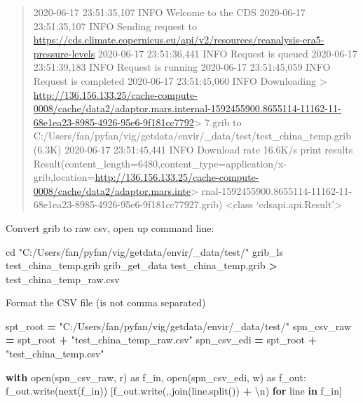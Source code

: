 \documentclass[
]{book}
\newenvironment{Shaded}{\begin{snugshade}}{\end{snugshade}}
\newcommand{\BuiltInTok}[1]{#1}
\newcommand{\CharTok}[1]{\textcolor[rgb]{0.31,0.60,0.02}{#1}}
\newcommand{\ControlFlowTok}[1]{\textcolor[rgb]{0.13,0.29,0.53}{\textbf{#1}}}
\newcommand{\ExtensionTok}[1]{#1}
\newcommand{\ImportTok}[1]{#1}
\newcommand{\KeywordTok}[1]{\textcolor[rgb]{0.13,0.29,0.53}{\textbf{#1}}}
\newcommand{\NormalTok}[1]{#1}
\newcommand{\OperatorTok}[1]{\textcolor[rgb]{0.81,0.36,0.00}{\textbf{#1}}}
\newcommand{\StringTok}[1]{\textcolor[rgb]{0.31,0.60,0.02}{#1}}
\begin{document}
\begin{quote}
2020-06-17 23:51:35,107 INFO Welcome to the CDS
2020-06-17 23:51:35,107 INFO Sending request to \url{https://cds.climate.copernicus.eu/api/v2/resources/reanalysis-era5-pressure-levels}
2020-06-17 23:51:36,441 INFO Request is queued
2020-06-17 23:51:39,183 INFO Request is running
2020-06-17 23:51:45,059 INFO Request is completed
2020-06-17 23:51:45,060 INFO Downloading \textgreater{} \url{http://136.156.133.25/cache-compute-0008/cache/data2/adaptor.mars.internal-1592455900.8655114-11162-11-68e1ea23-8985-4926-95e6-9f181cc7792}\textgreater{} 7.grib to C:/Users/fan/pyfan/vig/getdata/envir/\_data/test/test\_china\_temp.grib (6.3K)
2020-06-17 23:51:45,441 INFO Download rate 16.6K/s
print results
Result(content\_length=6480,content\_type=application/x-grib,location=\url{http://136.156.133.25/cache-compute-0008/cache/data2/adaptor.mars.inte}\textgreater{} rnal-1592455900.8655114-11162-11-68e1ea23-8985-4926-95e6-9f181cc77927.grib)
\textless class `cdsapi.api.Result'\textgreater{}
\end{quote}

Convert grib to raw csv, open up command line:

\begin{Shaded}
\begin{Highlighting}[]
\BuiltInTok{cd} \StringTok{"C:/Users/fan/pyfan/vig/getdata/envir/\_data/test/"}
\ExtensionTok{grib\_ls}\NormalTok{ test\_china\_temp.grib}
\ExtensionTok{grib\_get\_data}\NormalTok{ test\_china\_temp.grib }\OperatorTok{\textgreater{}}\NormalTok{ test\_china\_temp\_raw.csv}
\end{Highlighting}
\end{Shaded}

Format the CSV file (is not comma separated)

\begin{Shaded}
\begin{Highlighting}[]
\NormalTok{spt\_root }\OperatorTok{=} \StringTok{"C:/Users/fan/pyfan/vig/getdata/envir/\_data/test/"}
\NormalTok{spn\_csv\_raw }\OperatorTok{=}\NormalTok{ spt\_root }\OperatorTok{+} \StringTok{"test\_china\_temp\_raw.csv"}
\NormalTok{spn\_csv\_edi }\OperatorTok{=}\NormalTok{ spt\_root }\OperatorTok{+} \StringTok{"test\_china\_temp.csv"}

\ControlFlowTok{with} \BuiltInTok{open}\NormalTok{(spn\_csv\_raw, }\StringTok{\textquotesingle{}r\textquotesingle{}}\NormalTok{) }\ImportTok{as}\NormalTok{ f\_in, }\BuiltInTok{open}\NormalTok{(spn\_csv\_edi, }\StringTok{\textquotesingle{}w\textquotesingle{}}\NormalTok{) }\ImportTok{as}\NormalTok{ f\_out:}
\NormalTok{    f\_out.write(}\BuiltInTok{next}\NormalTok{(f\_in))}
\NormalTok{    [f\_out.write(}\StringTok{\textquotesingle{},\textquotesingle{}}\NormalTok{.join(line.split()) }\OperatorTok{+} \StringTok{\textquotesingle{}}\CharTok{\textbackslash{}n}\StringTok{\textquotesingle{}}\NormalTok{) }\ControlFlowTok{for}\NormalTok{ line }\KeywordTok{in}\NormalTok{ f\_in]}
\end{Highlighting}
\end{Shaded}
\end{document}
